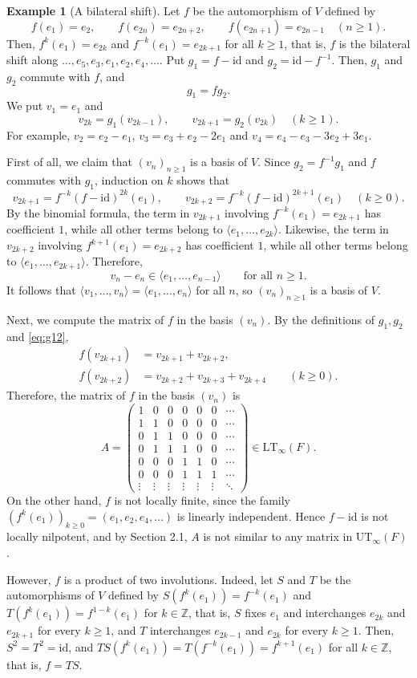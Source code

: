 \documentclass[11pt,reqno,a4paper]{amsart}
\numberwithin{equation}{section}
\theoremstyle{definition}
\newtheorem{example}[theorem]{Example}
\theoremstyle{plain}
\newcommand{\id}{\mathrm{id}}
\newcommand{\LT}{\mathrm{LT}_{\infty}}
\newcommand{\UT}{\mathrm{UT}_{\infty}}
\newcommand{\bbZ}{\mathbb Z}
\newcommand{\spann}[1]{\langle #1\rangle}
\begin{document}
\begin{example}[A bilateral shift]
Let $f$ be the automorphism of $V$ defined by
\[
f(e_1)=e_2,\qquad f(e_{2n})=e_{2n+2},\qquad f(e_{2n+1})=e_{2n-1}\quad(n\ge1).
\]
Then, $f^k(e_1)=e_{2k}$ and $f^{-k}(e_1)=e_{2k+1}$ for all $k\ge1$, that is, $f$ is the bilateral shift along $\ldots,e_5,e_3,e_1,e_2,e_4,\ldots$. Put $g_1=f-\id$ and $g_2=\id-f^{-1}$. Then, $g_1$ and $g_2$ commute with $f$, and
\begin{equation}\label{eq:g12}
g_1=fg_2.
\end{equation}
We put $v_1=e_1$ and
\[
v_{2k}=g_1(v_{2k-1}),\qquad v_{2k+1}=g_2(v_{2k})\quad(k\ge1).
\]
For example, $v_2=e_2-e_1$, $v_3=e_3+e_2-2e_1$ and $v_4=e_4-e_3-3e_2+3e_1$.

First of all, we claim that $(v_n)_{n\ge1}$ is a basis of $V$. Since $g_2=f^{-1}g_1$ and $f$ commutes with $g_1$, induction on $k$ shows that
\[
v_{2k+1}=f^{-k}(f-\id)^{2k}(e_1),\qquad
v_{2k+2}=f^{-k}(f-\id)^{2k+1}(e_1)\quad(k\ge0).
\]
By the binomial formula, the term in $v_{2k+1}$ involving $f^{-k}(e_1)=e_{2k+1}$ has coefficient $1$, while all other terms belong to $\spann{e_1,\ldots,e_{2k}}$. Likewise, the term in $v_{2k+2}$ involving $f^{k+1}(e_1)=e_{2k+2}$ has coefficient $1$, while all other terms belong to $\spann{e_1,\ldots,e_{2k+1}}$. Therefore,
\[
v_n-e_n\in\spann{e_1,\ldots,e_{n-1}}\qquad\text{for all }n\ge1.
\]
It follows that $\spann{v_1,\ldots,v_n}=\spann{e_1,\ldots,e_n}$ for all $n$, so $(v_n)_{n\ge1}$ is a basis of $V$.

Next, we compute the matrix of $f$ in the basis $(v_n)$. By the definitions of $g_1,g_2$ and \eqref{eq:g12},
\[
\begin{aligned}
f(v_{2k+1})&=v_{2k+1}+v_{2k+2},\\
f(v_{2k+2})&=v_{2k+2}+v_{2k+3}+v_{2k+4}\qquad(k\ge0).
\end{aligned}
\]
Therefore, the matrix of $f$ in the basis $(v_n)$ is
\[
A=\begin{pmatrix}
1&0&0&0&0&0&\cdots\\
1&1&0&0&0&0&\cdots\\
0&1&1&0&0&0&\cdots\\
0&1&1&1&0&0&\cdots\\
0&0&0&1&1&0&\cdots\\
0&0&0&1&1&1&\cdots\\
\vdots&\vdots&\vdots&\vdots&\vdots&\vdots&\ddots
\end{pmatrix}\in\LT(F).
\]
On the other hand, $f$ is not locally finite, since the family $(f^k(e_1))_{k\ge0}=(e_1,e_2,e_4,\ldots)$ is linearly independent. Hence $f-\id$ is not locally nilpotent, and by Section 2.1, $A$ is not similar to any matrix in $\UT(F)$.

However, $f$ is a product of two involutions. Indeed, let $S$ and $T$ be the automorphisms of $V$ defined by $S(f^k(e_1))=f^{-k}(e_1)$ and $T(f^k(e_1))=f^{1-k}(e_1)$ for $k\in\bbZ$, that is, $S$ fixes $e_1$ and interchanges $e_{2k}$ and $e_{2k+1}$ for every $k\ge1$, and $T$ interchanges $e_{2k-1}$ and $e_{2k}$ for every $k\ge1$. Then, $S^2=T^2=\id$, and $TS(f^k(e_1))=T(f^{-k}(e_1))=f^{k+1}(e_1)$ for all $k\in\bbZ$, that is, $f=TS$.
\end{example}
\end{document}
